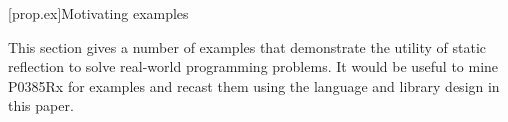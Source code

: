 [prop.ex]{Motivating examples}

This section gives a number of examples that demonstrate the utility of static reflection to solve real-world programming problems.
It would be useful to mine P0385Rx for examples and recast them using the language and library design in this paper.
